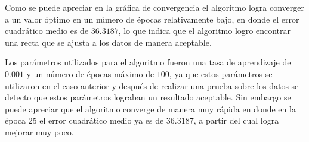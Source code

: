 \documentclass{article}
\theoremstyle{mytheoremstyle}
\theoremstyle{mytheoremstyle}
\theoremstyle{myproblemstyle}
\begin{document}
Como se puede apreciar en la gráfica de convergencia el algoritmo logra converger a un valor óptimo en un número de épocas relativamente bajo, en donde el error cuadrático medio es de $36.3187$, lo que indica que el algoritmo logro encontrar una recta que se ajusta a los datos de manera aceptable.

Los parámetros utilizados para el algoritmo fueron una tasa de aprendizaje de $0.001$ y un número de épocas máximo de $100$, ya que estos parámetros se utilizaron en el caso anterior y después de realizar una prueba sobre los datos se detecto que estos parámetros lograban un resultado aceptable. Sin embargo se puede apreciar que el algoritmo converge de manera muy rápida en donde en la época 25 el error cuadrático medio ya es de $36.3187$, a partir del cual logra mejorar muy poco.
\end{document}
